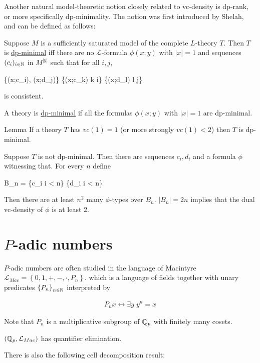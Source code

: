\documentclass{amsart}
\renewcommand{\LL}{\mathcal L}
\newcommand{\LLM}{\mathcal L_{Mac}}
\newcommand{\curly}[1]{\left\{#1\right\}}
\newcommand{\defn}{\underline}
\begin{document}
Another natural model-theoretic notion closely related to vc-density is dp-rank, or more specifically dp-minimality.
The notion was first introduced by Shelah, and can be defined as follows:

Suppose $M$ is a sufficiently saturated model of the complete $L$-theory $T$.
Then $T$ is \defn{dp-minimal} iff there are no $\LL$-formula $\phi(x; y)$ with $|x| = 1$ and
sequences $(c_i)_{i \in \mathbb{N}}$ in $M^{|y|}$ such that for all $i,j$,

\curly{\phi(x;c_i), \phi(x;d_j)} \cup \curly{\neg \phi(x;c_k) \mid k \neq i} \cup \curly{\neg \phi(x;d_l) \mid l \neq j}

is consistent.

A theory is \defn{dp-minimal} if all the formulas $\phi(x; y)$ with $|x| = 1$ are dp-minimal.

Lemma If a theory $T$ has $vc(1) = 1$ (or more strongly $vc(1) < 2$) then $T$ is dp-minimal.

Suppose $T$ is not dp-minimal.
Then there are sequences $c_i, d_i$ and a formula $\phi$ witnessing that.
For every $n$ define 

B_n = \curly{c_i \mid i < n} \cup \curly{d_i \mid i < n}

Then there are at least $n^2$ many $\phi$-types over $B_n$.
$|B_n| = 2n$ implies that the dual vc-density of $\phi$ is at least 2.


\section{$P$-adic numbers}


$P$-adic numbers are often studied in the language of Macintyre $\LLM = \curly{0, 1, +, -, \cdot, P_n}$.
which is a language of fields together with unary predicates $\curly{P_n}_{n \in \N} $ interpreted by

\begin{align*}
  P_n x \leftrightarrow \exists y \; y^n = x
\end{align*}  

Note that $P_n$ is a multiplicative subgroup of $\mathbb{Q}_p$ with finitely many cosets.

\begin{Theorem} [???]
  $(\Q_p, \LLM)$ has quantifier elimination.
\end{Theorem}

There is also the following cell decomposition result:
\end{document}
